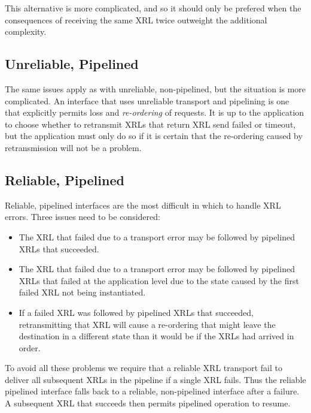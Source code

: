 \documentclass[11pt]{article}
\begin{document}
This alternative is more complicated, and so it should only be
prefered when the consequences of receiving the same XRL twice
outweight the additional complexity.

\subsection*{Unreliable, Pipelined}

The same issues apply as with unreliable, non-pipelined, but the
situation is more complicated.  An interface that uses unreliable
transport and pipelining is one that explicitly permits loss and {\em
re-ordering} of requests.  It is up to the application to choose
whether to retransmit XRLs that return XRL send failed or timeout, but
the application must only do so if it is certain that the re-ordering
caused by retransmission will not be a problem.

\subsection*{Reliable, Pipelined}

Reliable, pipelined interfaces are the most difficult in which to
handle XRL errors.  Three issues need to be considered:
\begin{itemize}
\item The XRL that failed due to a transport error may be followed by
pipelined XRLs that succeeded.
\item The XRL that failed due to a transport error may be followed by
pipelined XRLs that failed at the application level due to the state
caused by the first failed XRL not being instantiated.
\item If a failed XRL was followed by pipelined XRLs that succeeded,
retransmitting that XRL will cause a re-ordering that might leave the
destination in a different state than it would be if the XRLs had
arrived in order.
\end{itemize}
To avoid all these problems we require that a reliable XRL transport
fail to deliver all subsequent XRLs in the pipeline if a single XRL
fails.  Thus the reliable pipelined interface falls back to a
reliable, non-pipelined interface after a failure.  A subsequent XRL
that succeeds then permits pipelined operation to resume.





\end{document}
